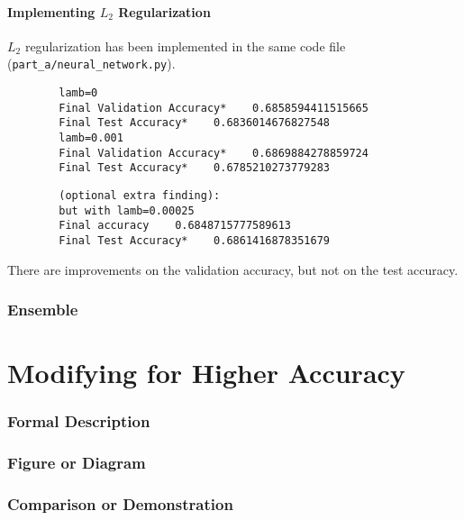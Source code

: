 \documentclass{article}
\begin{document}
    
    \subsection{Implementing $L_2$ Regularization}
    $L_2$ regularization has been implemented in the same code file (\verb|part_a/neural_network.py|).

    \begin{verbatim}
        lamb=0
        Final Validation Accuracy*    0.6858594411515665
        Final Test Accuracy*    0.6836014676827548
        lamb=0.001
        Final Validation Accuracy*    0.6869884278859724
        Final Test Accuracy*    0.6785210273779283
    \end{verbatim}

    \begin{verbatim}
        (optional extra finding):
        but with lamb=0.00025
        Final accuracy    0.6848715777589613
        Final Test Accuracy*    0.6861416878351679
    \end{verbatim}

    There are improvements on the validation accuracy, but not on the test accuracy.


    \pagebreak

    \section{Ensemble}

    \pagebreak

    \part{Modifying for Higher Accuracy}
    \section{Formal Description}
    \section{Figure or Diagram}
    \section{Comparison or Demonstration}
\end{document}
